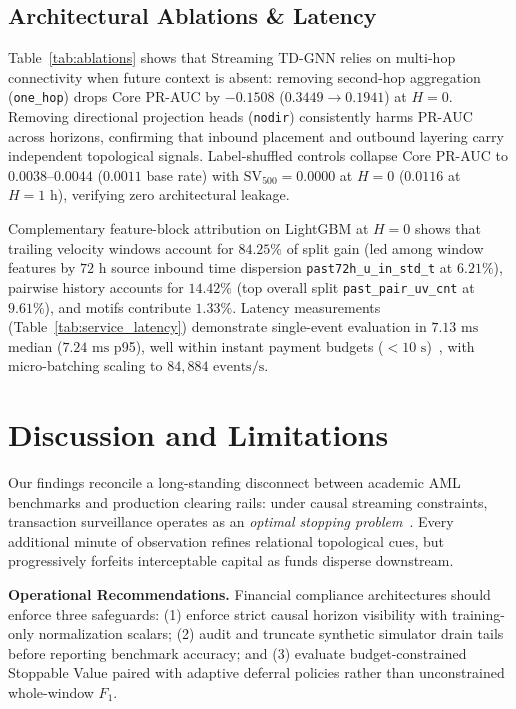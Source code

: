 \documentclass[sigconf,nonacm]{acmart}
\begin{document}
\subsection{Architectural Ablations \& Latency}
Table~\ref{tab:ablations} shows that Streaming TD-GNN relies on multi-hop connectivity when future context is absent: removing second-hop aggregation (\texttt{one\_hop}) drops Core PR-AUC by $-0.1508$ ($0.3449 \to 0.1941$) at $H=0$. Removing directional projection heads (\texttt{nodir}) consistently harms PR-AUC across horizons, confirming that inbound placement and outbound layering carry independent topological signals. Label-shuffled controls collapse Core PR-AUC to $0.0038$--$0.0044$ ($0.0011$ base rate) with $\text{SV}_{500} = 0.0000$ at $H=0$ ($0.0116$ at $H=1\text{ h}$), verifying zero architectural leakage.

Complementary feature-block attribution on LightGBM at $H=0$ shows that trailing velocity windows account for $84.25\%$ of split gain (led among window features by $72\text{ h}$ source inbound time dispersion \texttt{past72h\_u\_in\_std\_t} at $6.21\%$), pairwise history accounts for $14.42\%$ (top overall split \texttt{past\_pair\_uv\_cnt} at $9.61\%$), and motifs contribute $1.33\%$. Latency measurements (Table~\ref{tab:service_latency}) demonstrate single-event evaluation in $7.13\text{ ms}$ median ($7.24\text{ ms}$ p95), well within instant payment budgets ($<10\text{ s}$)~\cite{eu2024instant}, with micro-batching scaling to $84{,}884\text{ events/s}$.

\section{Discussion and Limitations}
\label{sec:discussion}

Our findings reconcile a long-standing disconnect between academic AML benchmarks and production clearing rails: under causal streaming constraints, transaction surveillance operates as an \emph{optimal stopping problem}~\cite{mori2018early,lan1983alpha}. Every additional minute of observation refines relational topological cues, but progressively forfeits interceptable capital as funds disperse downstream. 

\textbf{Operational Recommendations.} Financial compliance architectures should enforce three safeguards: (1) enforce strict causal horizon visibility with training-only normalization scalars; (2) audit and truncate synthetic simulator drain tails before reporting benchmark accuracy; and (3) evaluate budget-constrained Stoppable Value paired with adaptive deferral policies rather than unconstrained whole-window $F_1$.
\end{document}
